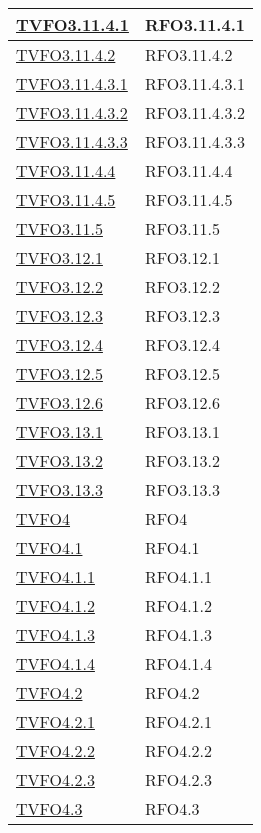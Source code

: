 \begin{longtable}{|>{\centering}m{5cm}|m{5cm}<{\centering}|}
\hyperlink{TVFO3.11.4.1}{TVFO3.11.4.1} & RFO3.11.4.1\\ \hline
\hyperlink{TVFO3.11.4.2}{TVFO3.11.4.2} & RFO3.11.4.2\\ \hline
\hyperlink{TVFO3.11.4.3.1}{TVFO3.11.4.3.1} & RFO3.11.4.3.1\\ \hline
\hyperlink{TVFO3.11.4.3.2}{TVFO3.11.4.3.2} & RFO3.11.4.3.2\\ \hline
\hyperlink{TVFO3.11.4.3.3}{TVFO3.11.4.3.3} & RFO3.11.4.3.3\\ \hline
\hyperlink{TVFO3.11.4.4}{TVFO3.11.4.4} & RFO3.11.4.4\\ \hline
\hyperlink{TVFO3.11.4.5}{TVFO3.11.4.5} & RFO3.11.4.5\\ \hline
\hyperlink{TVFO3.11.5}{TVFO3.11.5} & RFO3.11.5\\ \hline
\hyperlink{TVFO3.12.1}{TVFO3.12.1} & RFO3.12.1\\ \hline
\hyperlink{TVFO3.12.2}{TVFO3.12.2} & RFO3.12.2\\ \hline
\hyperlink{TVFO3.12.3}{TVFO3.12.3} & RFO3.12.3\\ \hline
\hyperlink{TVFO3.12.4}{TVFO3.12.4} & RFO3.12.4\\ \hline
\hyperlink{TVFO3.12.5}{TVFO3.12.5} & RFO3.12.5\\ \hline
\hyperlink{TVFO3.12.6}{TVFO3.12.6} & RFO3.12.6\\ \hline
\hyperlink{TVFO3.13.1}{TVFO3.13.1} & RFO3.13.1\\ \hline
\hyperlink{TVFO3.13.2}{TVFO3.13.2} & RFO3.13.2\\ \hline
\hyperlink{TVFO3.13.3}{TVFO3.13.3} & RFO3.13.3\\ \hline
\hyperlink{TVFO4}{TVFO4} & RFO4\\ \hline
\hyperlink{TVFO4.1}{TVFO4.1} & RFO4.1\\ \hline
\hyperlink{TVFO4.1.1}{TVFO4.1.1} & RFO4.1.1\\ \hline
\hyperlink{TVFO4.1.2}{TVFO4.1.2} & RFO4.1.2\\ \hline
\hyperlink{TVFO4.1.3}{TVFO4.1.3} & RFO4.1.3\\ \hline
\hyperlink{TVFO4.1.4}{TVFO4.1.4} & RFO4.1.4\\ \hline
\hyperlink{TVFO4.2}{TVFO4.2} & RFO4.2\\ \hline
\hyperlink{TVFO4.2.1}{TVFO4.2.1} & RFO4.2.1\\ \hline
\hyperlink{TVFO4.2.2}{TVFO4.2.2} & RFO4.2.2\\ \hline
\hyperlink{TVFO4.2.3}{TVFO4.2.3} & RFO4.2.3\\ \hline
\hyperlink{TVFO4.3}{TVFO4.3} & RFO4.3\\ \hline

\end{longtable}
